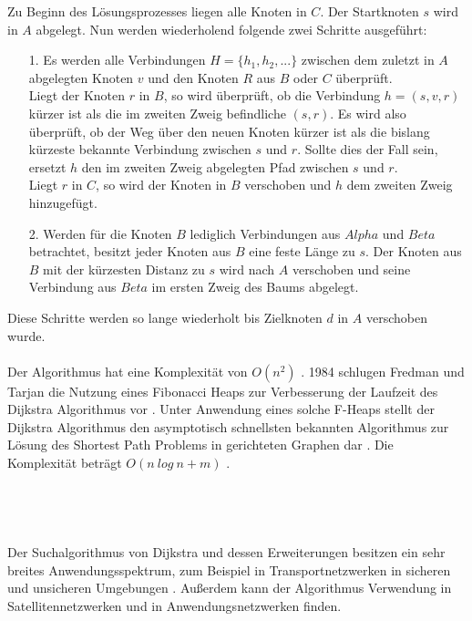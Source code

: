 Zu Beginn des Lösungsprozesses liegen alle Knoten in $C$. Der Startknoten $s$ wird in $A$ abgelegt. Nun werden wiederholend folgende zwei Schritte ausgeführt:
\begin{itemize}
	\item[1.] Es werden alle Verbindungen $H = \{h_1, h_2, ...\}$ zwischen dem zuletzt in $A$ abgelegten Knoten $v$ und den Knoten $R$ aus $B$ oder $C$ überprüft.\\ Liegt der Knoten $r$ in $B$, so wird überprüft, ob die Verbindung $h = \left(s, v, r\right)$ kürzer ist als die im zweiten Zweig befindliche $\left(s, r\right)$. Es wird also überprüft, ob der Weg über den neuen Knoten kürzer ist als die bislang kürzeste bekannte Verbindung zwischen $s$ und $r$. Sollte dies der Fall sein, ersetzt $h$ den im zweiten Zweig abgelegten Pfad zwischen $s$ und $r$. \\Liegt $r$ in $C$, so wird der Knoten in $B$ verschoben und $h$ dem zweiten Zweig hinzugefügt.
	\item[2.] Werden für die Knoten $B$ lediglich Verbindungen aus $Alpha$ und $Beta$ betrachtet, besitzt jeder Knoten aus $B$ eine feste Länge zu $s$. Der Knoten aus $B$ mit der kürzesten Distanz zu $s$ wird nach $A$ verschoben und seine Verbindung aus $Beta$ im ersten Zweig des Baums abgelegt.
\end{itemize}
Diese Schritte werden so lange wiederholt bis Zielknoten $d$ in $A$ verschoben wurde. \\ \\	
Der Algorithmus hat eine Komplexität von $O(n^2)$ \cite[S.5]{Madkour.2017}. 1984 schlugen Fredman und Tarjan die Nutzung eines Fibonacci Heaps zur Verbesserung der Laufzeit des Dijkstra Algorithmus vor \cite{Fredman.1987}. Unter Anwendung eines solche F-Heaps stellt der Dijkstra Algorithmus den asymptotisch schnellsten bekannten Algorithmus zur Lösung des Shortest Path Problems in gerichteten Graphen dar \cite{Schmitz.2019}.  Die Komplexität beträgt $O(n\ log\ n + m)$ \cite[S.5]{Madkour.2017}. \\ \\ \\ \\ \\
Der Suchalgorithmus von Dijkstra und dessen Erweiterungen besitzen ein sehr breites Anwendungsspektrum, zum Beispiel in Transportnetzwerken in sicheren \cite{BAN17} und unsicheren Umgebungen \cite{DCZM12}. Außerdem kann der Algorithmus Verwendung in Satellitennetzwerken \cite{HH15} und in Anwendungsnetzwerken \cite{JYA14} finden.

